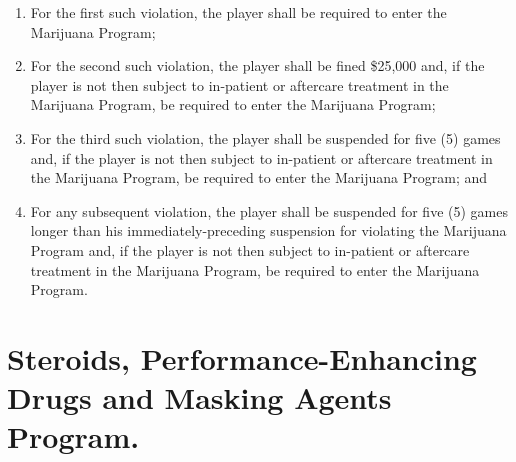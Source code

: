 \documentclass[
]{book}
\providecommand{\tightlist}{%
  \setlength{\itemsep}{0pt}\setlength{\parskip}{0pt}}
\begin{document}
\begin{enumerate}
  \begin{enumerate}
  \def\labelenumii{(\Alph{enumii})}
  \tightlist
  \item
    For the first such violation, the player shall be required to enter the Marijuana Program;
  \item
    For the second such violation, the player shall be fined \$25,000 and, if the player is not then subject to in-patient or aftercare treatment in the Marijuana Program, be required to enter the Marijuana Program;
  \item
    For the third such violation, the player shall be suspended for five (5) games and, if the player is not then subject to in-patient or aftercare treatment in the Marijuana Program, be required to enter the Marijuana Program; and
  \item
    For any subsequent violation, the player shall be suspended for five (5) games longer than his immediately-preceding suspension for violating the Marijuana Program and, if the player is not then subject to in-patient or aftercare treatment in the Marijuana Program, be required to enter the Marijuana Program.
  \end{enumerate}
\end{enumerate}

\hypertarget{steroids-performance-enhancing-drugs-and-masking-agents-program.}{%
\section{Steroids, Performance-Enhancing Drugs and Masking Agents Program.}\label{steroids-performance-enhancing-drugs-and-masking-agents-program.}}
\end{document}
